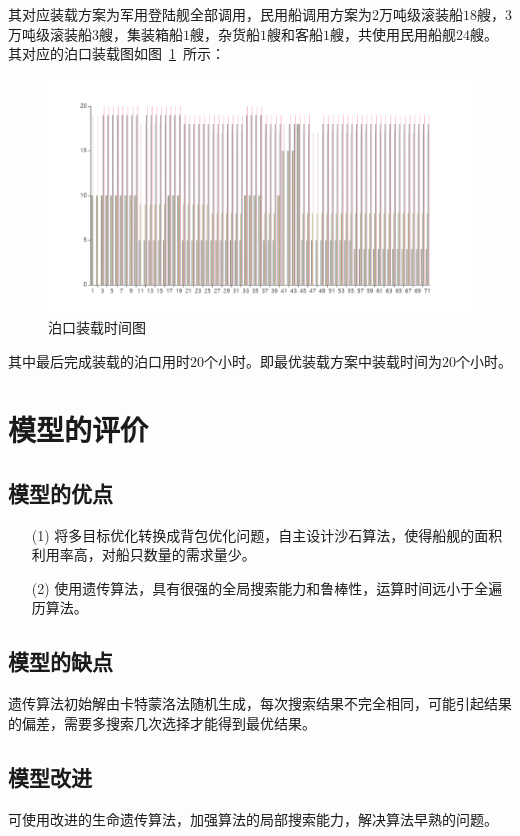 \documentclass{whutmod}
\begin{document}
     其对应装载方案为军用登陆舰全部调用，民用船调用方案为2万吨级滚装船$18$艘，3万吨级滚装船$3$艘，集装箱船$1$艘，杂货船$1$艘和客船$1$艘，共使用民用船舰$24$艘。
     其对应的泊口装载图如图~\ref{nb}~所示：
   	\begin{figure}[H]
     	\centering
     	\includegraphics[width=\textwidth]{figures/bo2.png}
     	\caption{泊口装载时间图}\label{nb}
     \end{figure}
     
     其中最后完成装载的泊口用时$20$个小时。即最优装载方案中装载时间为$20$个小时。



	\section{模型的评价}
	\subsection{模型的优点}
		\begin{itemize}                                             

		\item [(1)] 将多目标优化转换成背包优化问题，自主设计沙石算法，使得船舰的面积利用率高，对船只数量的需求量少。
		\item [(2)] 使用遗传算法，具有很强的全局搜索能力和鲁棒性，运算时间远小于全遍历算法。
	\end{itemize}
	\subsection{模型的缺点}

	遗传算法初始解由卡特蒙洛法随机生成，每次搜索结果不完全相同，可能引起结果的偏差，需要多搜索几次选择才能得到最优结果。
	\subsection{模型改进}
	可使用改进的生命遗传算法，加强算法的局部搜索能力，解决算法早熟的问题。
\end{document}
